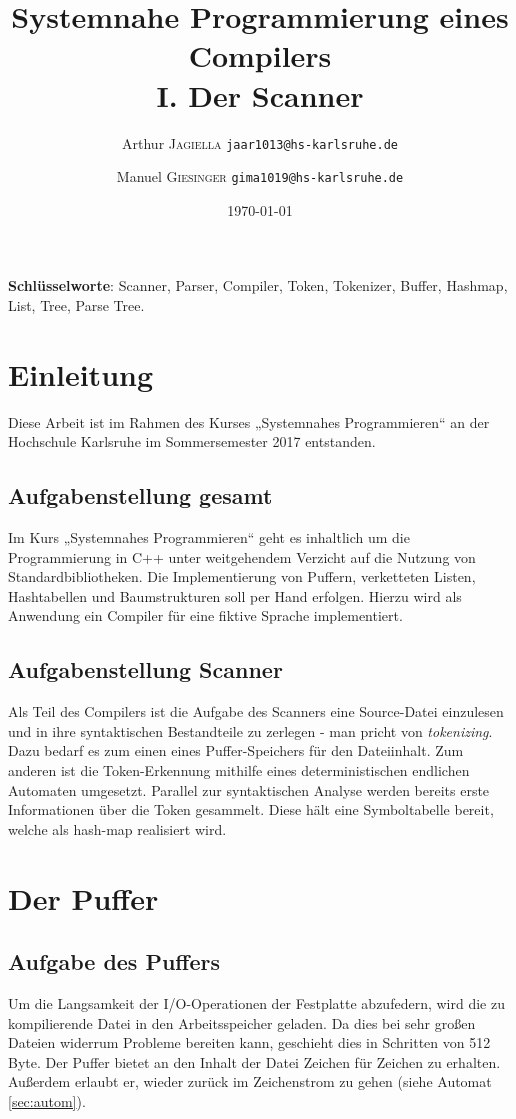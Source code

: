\documentclass[
a4paper,   %
11pt,      %
oneside,   %
onecolumn, %
final      %
]{article}
\title{Systemnahe Programmierung eines Compilers\\I. Der Scanner}
\author{Arthur \textsc{Jagiella} \hspace{1cm} \texttt{jaar1013@hs-karlsruhe.de} \and Manuel \textsc{Giesinger} \hspace{1cm} \texttt{gima1019@hs-karlsruhe.de}}
\date{\today}
\begin{document}
\maketitle



\textbf{Schlüsselworte}: Scanner, Parser, Compiler, Token, Tokenizer, Buffer, Hashmap, List, Tree, Parse Tree.


\section{Einleitung} %
Diese Arbeit ist im Rahmen des Kurses „Systemnahes Programmieren“ an der Hochschule Karlsruhe im Sommersemester 2017 entstanden. 

\subsection{Aufgabenstellung gesamt}
Im Kurs „Systemnahes Programmieren“ geht es inhaltlich um die Programmierung in C++ unter weitgehendem Verzicht auf die Nutzung von Standardbibliotheken. Die Implementierung von Puffern, verketteten Listen, Hashtabellen und Baumstrukturen soll per Hand erfolgen. Hierzu wird als Anwendung ein Compiler für eine fiktive Sprache implementiert.

\subsection{Aufgabenstellung Scanner} 
Als Teil des Compilers ist die Aufgabe des Scanners eine Source-Datei einzulesen und in ihre syntaktischen Bestandteile zu zerlegen - man pricht von \emph{tokenizing}. Dazu bedarf es zum einen eines Puffer-Speichers für den Dateiinhalt. Zum anderen ist die Token-Erkennung mithilfe eines deterministischen endlichen Automaten umgesetzt.
Parallel zur syntaktischen Analyse werden bereits erste Informationen über die Token gesammelt. Diese hält eine Symboltabelle bereit, welche als hash-map realisiert wird.


\section{Der Puffer}

\subsection{Aufgabe des Puffers}
Um die Langsamkeit der I/O-Operationen der Festplatte abzufedern, wird die zu kompilierende Datei in den Arbeitsspeicher geladen.
Da dies bei sehr großen Dateien widerrum Probleme bereiten kann, geschieht dies in Schritten von 512 Byte.
Der Puffer bietet an den Inhalt der Datei Zeichen für Zeichen zu erhalten.
Außerdem erlaubt er, wieder zurück im Zeichenstrom zu gehen (siehe Automat \ref{sec:autom}).
\end{document}
